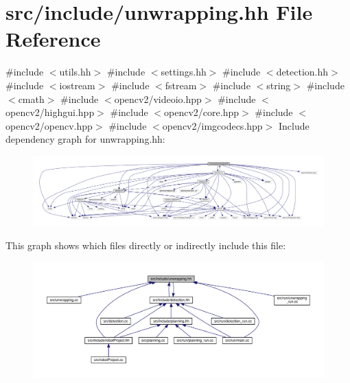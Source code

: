 \hypertarget{unwrapping_8hh}{}\section{src/include/unwrapping.hh File Reference}
\label{unwrapping_8hh}
{\ttfamily \#include $<$utils.\+hh$>$}\newline
{\ttfamily \#include $<$settings.\+hh$>$}\newline
{\ttfamily \#include $<$detection.\+hh$>$}\newline
{\ttfamily \#include $<$iostream$>$}\newline
{\ttfamily \#include $<$fstream$>$}\newline
{\ttfamily \#include $<$string$>$}\newline
{\ttfamily \#include $<$cmath$>$}\newline
{\ttfamily \#include $<$opencv2/videoio.\+hpp$>$}\newline
{\ttfamily \#include $<$opencv2/highgui.\+hpp$>$}\newline
{\ttfamily \#include $<$opencv2/core.\+hpp$>$}\newline
{\ttfamily \#include $<$opencv2/opencv.\+hpp$>$}\newline
{\ttfamily \#include $<$opencv2/imgcodecs.\+hpp$>$}\newline
Include dependency graph for unwrapping.\+hh\+:
\nopagebreak
\begin{figure}[H]
\begin{center}
\leavevmode
\includegraphics[width=350pt]{unwrapping_8hh__incl}
\end{center}
\end{figure}
This graph shows which files directly or indirectly include this file\+:
\nopagebreak
\begin{figure}[H]
\begin{center}
\leavevmode
\includegraphics[width=350pt]{unwrapping_8hh__dep__incl}
\end{center}
\end{figure}
